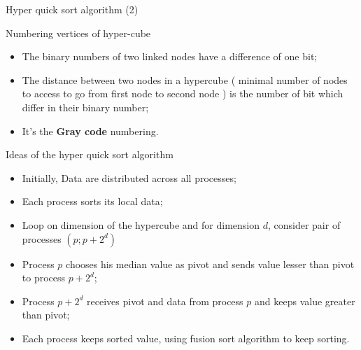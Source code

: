 \documentclass[compress,10pt,aspectratio=169]{beamer}
\begin{document}
\begin{frame}[fragile]{Hyper quick sort algorithm (2)}
\scriptsize

\begin{block}{\small Numbering vertices of hyper-cube}
\begin{itemize}
    \item The binary numbers of two linked nodes have a difference of one bit;
    \item The distance between two nodes in a hypercube ( minimal number of nodes to access to go from
          first node to second node ) is the number of bit which differ in their binary number;
    \item It's the \textbf{Gray code} numbering.
\end{itemize}        
\end{block}

\begin{exampleblock}{\small Ideas of the hyper quick sort algorithm}
    \begin{itemize}
        \item Initially, Data are distributed across all processes;
        \item Each process sorts its local data;
        \item Loop on dimension of the hypercube and for dimension $d$, consider pair of processes $\left(p;p+2^{d}\right)$
        \item Process $p$ chooses his median value as pivot and sends value lesser than pivot to process $p+2^{d}$;
        \item Process $p+2^{d}$ receives pivot and data from process $p$ and keeps value greater than pivot;
        \item Each process keeps sorted value, using fusion sort algorithm to keep sorting.
    \end{itemize}
\end{exampleblock}
\end{frame}
\end{document}
